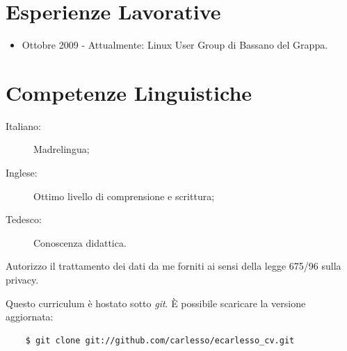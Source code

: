 \documentclass[pdftex, a4paper, 11pt]{article}
\begin{document}
\section*{Esperienze Lavorative}
\begin{itemize}
\item Ottobre 2009 - Attualmente: Linux User Group di Bassano del
  Grappa.
\end{itemize}

\section*{Competenze Linguistiche}
\begin{description}
\item[Italiano:] Madrelingua;
\item[Inglese:] Ottimo livello di comprensione e scrittura;
\item[Tedesco:] Conoscenza didattica.
\end{description}


\vfill

Autorizzo il trattamento dei dati da me forniti ai sensi della legge
675/96 sulla privacy.

\vspace{1cm}

\footnotesize {Questo curriculum \`e hostato sotto {\em git}. \`E possibile scaricare la versione aggiornata:}
\begin{verbatim}
    $ git clone git://github.com/carlesso/ecarlesso_cv.git
\end{verbatim}
\end{document}
